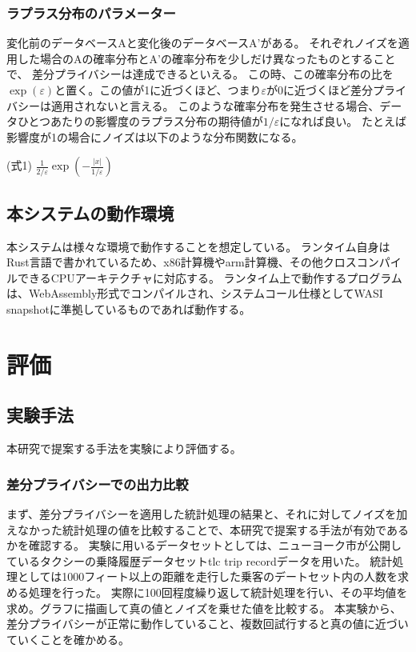 \documentclass[a4paper,11pt]{jreport}
\begin{document}
\subsection{ラプラス分布のパラメーター}

変化前のデータベースAと変化後のデータベースA'がある。
それぞれノイズを適用した場合のAの確率分布とA'の確率分布を少しだけ異なったものとすることで、
差分プライバシーは達成できるといえる。
この時、この確率分布の比を$\exp(\varepsilon)$と置く。この値が1に近づくほど、つまり$\varepsilon$が0に近づくほど差分プライバシーは適用されないと言える。
このような確率分布を発生させる場合、データひとつあたりの影響度のラプラス分布の期待値が$1/\varepsilon$になれば良い。
たとえば影響度が1の場合にノイズは以下のような分布関数になる。

(式1)
\newblock $\frac{1}{2/\varepsilon} \exp( -\frac{|x|}{1/\varepsilon} )$

\section{本システムの動作環境}

本システムは様々な環境で動作することを想定している。
ランタイム自身はRust言語で書かれているため、x86計算機やarm計算機、その他クロスコンパイルできるCPUアーキテクチャに対応する。
ランタイム上で動作するプログラムは、WebAssembly形式でコンパイルされ、システムコール仕様としてWASI snapshotに準拠しているものであれば動作する。


\chapter{評価}
\section{実験手法}
本研究で提案する手法を実験により評価する。

\subsection{差分プライバシーでの出力比較}

まず、差分プライバシーを適用した統計処理の結果と、それに対してノイズを加えなかった統計処理の値を比較することで、本研究で提案する手法が有効であるかを確認する。
実験に用いるデータセットとしては、ニューヨーク市が公開しているタクシーの乗降履歴データセットtlc trip recordデータを用いた。
統計処理としては1000フィート以上の距離を走行した乗客のデートセット内の人数を求める処理を行った。
実際に100回程度繰り返して統計処理を行い、その平均値を求め。グラフに描画して真の値とノイズを乗せた値を比較する。
本実験から、差分プライバシーが正常に動作していること、複数回試行すると真の値に近づいていくことを確かめる。
\end{document}
